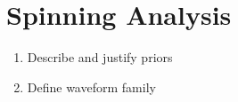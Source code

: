 \section{Spinning Analysis}

\begin{enumerate}
\item Describe and justify priors
\item Define waveform family
\end{enumerate}
